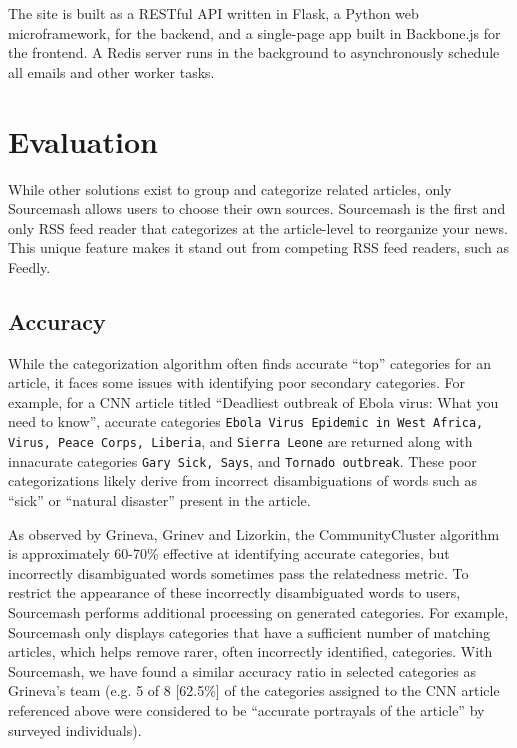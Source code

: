 \documentclass[11pt]{article}
\begin{document}
The site is built as a RESTful API written in Flask, a Python web microframework, for the backend, and a single-page app built in Backbone.js for the frontend. A Redis server runs in the background to asynchronously schedule all emails and other worker tasks.


\section{Evaluation}

While other solutions exist to group and categorize related articles, only Sourcemash allows users to choose their own sources. Sourcemash is the first and only RSS feed reader that categorizes at the article-level to reorganize your news. This unique feature makes it stand out from competing RSS feed readers, such as Feedly.

\subsection{Accuracy}
While the categorization algorithm often finds accurate ``top'' categories for an article, it faces some issues with identifying poor secondary categories. For example, for a CNN article titled ``Deadliest outbreak of Ebola virus: What you need to know''\cite{Ebola}, accurate categories \texttt{Ebola Virus Epidemic in West Africa, Virus, Peace Corps, Liberia}, and \texttt{Sierra Leone} are returned along with innacurate categories \texttt{Gary Sick, Says}, and \texttt{Tornado outbreak}. These poor categorizations likely derive from incorrect disambiguations of words such as ``sick'' or ``natural disaster'' present in the article. 

As observed by Grineva, Grinev and Lizorkin\cite{Grineva}, the CommunityCluster algorithm is approximately 60-70\% effective at identifying accurate categories, but incorrectly disambiguated words sometimes pass the relatedness metric. To restrict the appearance of these incorrectly disambiguated words to users, Sourcemash performs additional processing on generated categories. For example, Sourcemash only displays categories that have a sufficient number of matching articles, which helps remove rarer, often incorrectly identified, categories. With Sourcemash, we have found a similar accuracy ratio in selected categories as Grineva's team (e.g. 5 of 8 [62.5\%] of the categories assigned to the CNN article\cite{Ebola} referenced above were considered to be ``accurate portrayals of the article'' by surveyed individuals). 
\end{document}
